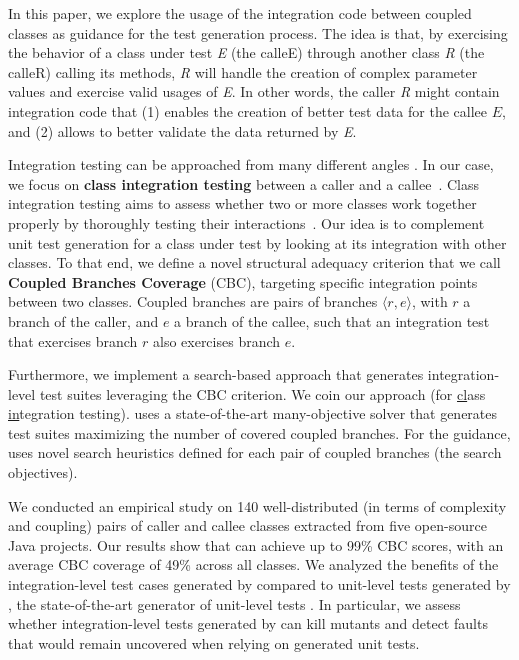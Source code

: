 In this paper, we explore the usage of the integration code between coupled classes as guidance for the test generation process. The idea is that, by exercising the behavior of 
a class under test \textit{E} (the calleE) through another class \textit{R} (the calleR) calling its methods, \textit{R} will handle the creation of complex parameter values and exercise valid 
usages of \textit{E}. In other words, the caller \textit{R} might contain integration code that (1) enables the creation of better test data for the callee $E$, and (2) allows to better validate the data returned 
by \textit{E}.

Integration testing can be approached from many different angles \cite{Jin1998,Offutt2000b}.
In our case, we focus on \textbf{class integration testing} between a caller and a callee~\cite{scott1997building}.  Class integration 
testing aims to assess whether two or more classes work together properly by thoroughly testing their interactions~\cite{scott1997building}. Our idea is to  complement unit test generation
for a class under test by looking at its integration with other classes. To that end, we define a novel structural adequacy criterion that we call \textbf{Coupled Branches Coverage} (CBC), targeting specific integration 
points between two classes. Coupled branches are pairs of branches 
$\langle r, e\rangle$, with $r$ a branch of the caller, and $e$ a branch of the callee,
such that an integration test that exercises branch $r$ also exercises branch $e$.

Furthermore, we implement a search-based approach that generates integration-level test suites leveraging the CBC criterion. We coin our approach \integration
(for \underline{cl}ass \underline{in}tegration testin{\underline g}). \cling uses a state-of-the-art many-objective solver that generates test suites maximizing the number of covered coupled branches. For the guidance, \cling uses novel search heuristics defined for each pair of coupled branches (the search objectives).


We conducted an empirical study on 140 well-distributed (in terms of complexity and coupling) pairs of caller and callee classes extracted from five open-source Java projects. Our results show that \cling can achieve up to 99\% CBC scores, with an average CBC coverage of 49\% across all classes. We analyzed the benefits of the integration-level test cases generated by \cling compared to unit-level tests generated by \evosuite, the state-of-the-art generator of unit-level tests \cite{Fraser2011}. In particular, we assess whether integration-level tests generated by \cling can kill mutants and detect faults that would remain uncovered when relying on generated unit tests. 

